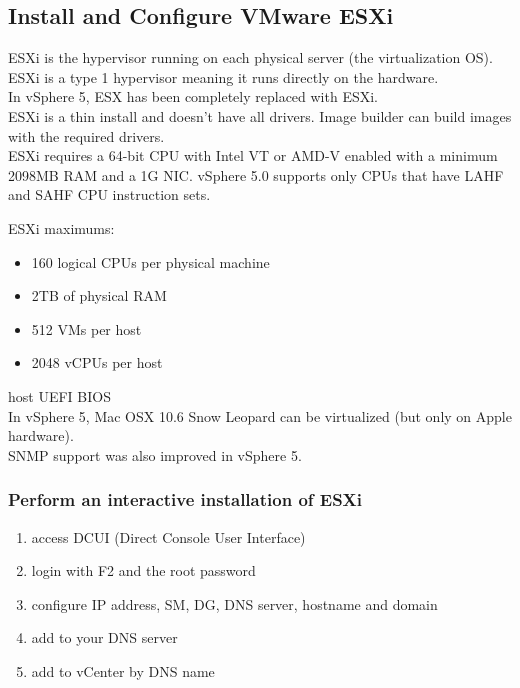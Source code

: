 \subsection{Install and Configure VMware ESXi}

ESXi is the hypervisor running on each physical server (the virtualization
OS). ESXi is a type 1 hypervisor meaning it runs directly on the hardware.\\

In vSphere 5, ESX has been completely replaced with ESXi.\\

ESXi is a thin install and doesn't have all drivers. Image builder can build
images with the required drivers.\\

ESXi requires a 64-bit CPU with Intel VT or AMD-V enabled with a minimum 2098MB RAM and a
1G NIC. vSphere 5.0 supports only CPUs that have LAHF and SAHF CPU instruction sets.

ESXi maximums:

\begin{itemize}

\item 160 logical CPUs per physical machine
\item 2TB of physical RAM
\item 512 VMs per host
\item 2048 vCPUs per host

\end{itemize}

host UEFI BIOS\\

In vSphere 5, Mac OSX 10.6 Snow Leopard can be virtualized (but only on Apple
hardware).\\

SNMP support was also improved in vSphere 5.

\subsubsection{Perform an interactive installation of ESXi}

\begin{enumerate}
\item access DCUI (Direct Console User Interface)
\item login with F2 and the root password
\item configure IP address, SM, DG, DNS server, hostname and domain
\item add to your DNS server
\item add to vCenter by DNS name
\end{enumerate}

